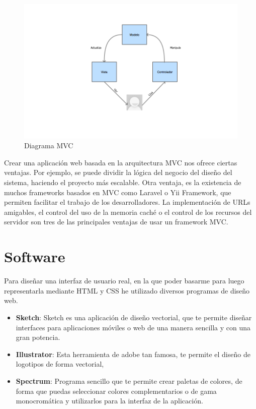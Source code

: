 \begin{figure}
\begin{center}
\includegraphics[scale=0.5]{imagenes/mvc.png}
\caption{Diagrama MVC}
\label{logo_mvc}
\end{center}
\end{figure}

\vspace{5 mm}

Crear una aplicación web basada en la arquitectura MVC nos ofrece ciertas ventajas. Por ejemplo, se puede dividir la lógica del negocio del diseño del sistema, haciendo el proyecto más escalable. Otra ventaja, es la existencia  de muchos frameworks basados en MVC como Laravel o Yii Framework, que permiten facilitar el trabajo de los desarrolladores. La implementación de URLs amigables, el control del uso de la memoria caché o el control de los recursos del servidor son tres de las principales ventajas de usar un framework MVC.


\section{Software}

Para diseñar una interfaz de usuario real, en la que poder basarme para luego representarla mediante HTML y CSS he utilizado diversos programas de diseño web.

\begin{itemize}

\item \textbf{Sketch}: Sketch es una aplicación de diseño vectorial, que te permite diseñar interfaces para aplicaciones móviles o web de una manera sencilla y con una gran potencia.
\item \textbf{Illustrator}: Esta herramienta de adobe tan famosa, te permite el diseño de logotipos de forma vectorial,
\item \textbf{Spectrum}: Programa sencillo que te permite crear paletas de colores, de forma que puedas seleccionar colores complementarios o de gama monocromática y utilizarlos para la interfaz de la aplicación.

\end{itemize}

